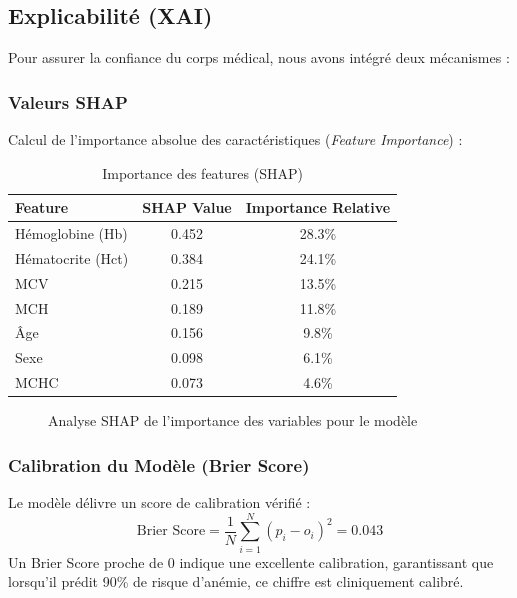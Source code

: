\documentclass[12pt,a4paper]{article}
\begin{document}
\subsection{Explicabilité (XAI)}
Pour assurer la confiance du corps médical, nous avons intégré deux mécanismes :

\subsubsection{Valeurs SHAP}
Calcul de l'importance absolue des caractéristiques (\textit{Feature Importance}) :

\begin{table}[H]
\centering
\caption{Importance des features (SHAP)}
\label{tab:shap}
\begin{tabular}{l c c}
\toprule
\textbf{Feature} & \textbf{SHAP Value} & \textbf{Importance Relative} \\
\midrule
Hémoglobine (Hb) & 0.452 & 28.3\% \\
Hématocrite (Hct) & 0.384 & 24.1\% \\
MCV & 0.215 & 13.5\% \\
MCH & 0.189 & 11.8\% \\
Âge & 0.156 & 9.8\% \\
Sexe & 0.098 & 6.1\% \\
MCHC & 0.073 & 4.6\% \\
\bottomrule
\end{tabular}
\end{table}

\begin{figure}[H]
\centering
{}
\caption{Analyse SHAP de l'importance des variables pour le modèle}
\label{fig:shap_analysis}
\end{figure}

\subsubsection{Calibration du Modèle (Brier Score)}
Le modèle délivre un score de calibration vérifié :
\begin{equation}
\text{Brier Score} = \frac{1}{N} \sum_{i=1}^{N} (p_i - o_i)^2 = 0.043
\end{equation}
Un Brier Score proche de 0 indique une excellente calibration, garantissant que lorsqu'il prédit 90\% de risque d'anémie, ce chiffre est cliniquement calibré.
\end{document}

